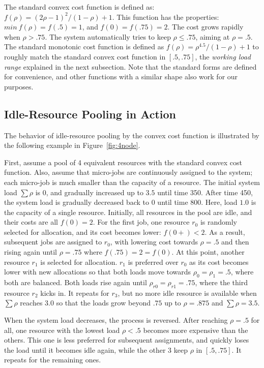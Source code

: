 The standard convex cost function is defined as:
$f(\rho) = (2\rho - 1)^{2}/(1 - \rho) + 1$.
This function has the properties:
$min\: f(\rho) = f(.5) = 1$, and $f(0) = f(.75) = 2$.
The cost grows rapidly when $\rho > .75$.
The system automatically tries to keep $\rho \le .75$,
aiming at $\rho = .5$.
The standard monotonic cost function is defined as
\( f(\rho) = \rho^{4.5}/(1 - \rho) + 1\)
to roughly match the standard convex cost function in $[.5, .75]$,
the {\em working load range} explained in the next subsection.
Note that the standard forms are defined for convenience, and
other functions with a similar shape also work for our purposes.

\subsection{Idle-Resource Pooling in Action}

The behavior of idle-resource pooling by the convex cost function is
illustrated by the following example in Figure~\ref{fig:4node}.

First, assume a pool of 4 equivalent resources with the standard convex
cost function.
Also, assume that micro-jobs are continuously assigned to the
system; each micro-job is much smaller than the capacity of a
resource.
The initial system load $\sum \rho$ is $0$, and gradually increased up
to $3.5$ until time 350. After time 450, the system load is gradually
decreased back to $0$ until time 800.
Here, load $1.0$ is the capacity of a single resource.
Initially, all resources in the pool are idle, and their costs are
all $f(0)= 2$.
For the first job, one resource $r_{0}$ is randomly selected for allocation, and its
cost becomes lower: $f(0+) < 2$. As a result, subsequent jobs are
assigned to $r_{0}$, with lowering cost towards $\rho = .5$ and then
rising again until $\rho = .75$ where $f(.75) = 2 = f(0)$.
At this point, another resource $r_{1}$ is selected for allocation.
$r_{1}$ is preferred over $r_{0}$ as its cost becomes lower with new
allocations so that both loads move towards $\rho_{0} = \rho_{1} = .5$,
where both are balanced.
Both loads rise again until $\rho_{r0} = \rho_{r1} = .75$,
where the third resource $r_{2}$ kicks in.
It repeats for $r_{3}$, but no more idle resource is available
when $\sum \rho$ reaches $3.0$ so that the loads grow beyond $.75$
up to $\rho = .875$ and $\sum \rho = 3.5$.

When the system load decreases, the process is reversed.
After reaching $\rho = .5$ for all,
one resource with the lowest load $\rho < .5$ becomes more expensive
than the others.
This one is less preferred for subsequent assignments, and quickly
loses the load until it becomes idle again, while the other 3 keep
$\rho$ in $[.5, .75]$. It repeats for the remaining ones.

